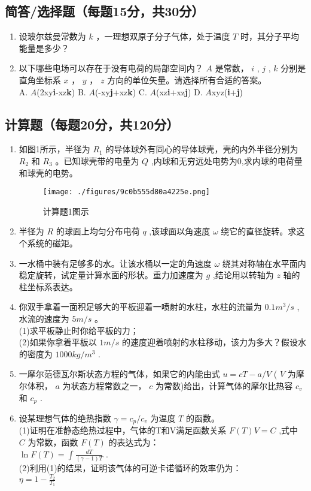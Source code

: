 


\subsection{简答/选择题（每题15分，共30分）}
\begin{enumerate}
\item 设玻尔兹曼常数为 $k$ ，一理想双原子分子气体，处于温度 $T$ 时，其分子平均能量是多少？
\item 以下哪些电场可以存在于没有电荷的局部空间内？ $A$ 是常数， $i$ , $j$ , $k$ 分别是直角坐标系 $x$ ， $y$ ， $z$ 方向的单位矢量。请选择所有合适的答案。\\
A. $A$(2xy\textbf{i}-xz\textbf{k}) B. $A$(-xy\textbf{j}+xz\textbf{k}) C. $A$(xz\textbf{i}+xz\textbf{j}) D. $A$xyz(\textbf{i}+\textbf{j})
\end{enumerate}
\subsection{计算题（每题20分，共120分）}
\begin{enumerate}
\item 如图1所示，半径为 $R_1$ 的导体球外有同心的导体球壳，壳的内外半径分别为 $R_2$ 和 $R_3$ 。已知球壳带的电量为 $Q$ ,内球和无穷远处电势为0,求内球的电荷量和球壳的电势。\\
\begin{figure}[ht]
\centering
\texttt{[image: ./figures/9c0b555d80a4225e.png]}
\caption{计算题1图示} \label{fig_USTC16_1}
\end{figure}
\item 半径为 $R$ 的球面上均匀分布电荷 $q$ ,该球面以角速度 $\omega$ 绕它的直径旋转。求这个系统的磁矩。
\item 一水桶中装有足够多的水。让该水桶以一定的角速度 $\omega$ 绕其对称轴在水平面内稳定旋转，试定量计算水面的形状。重力加速度为 $g$ ,结论用以转轴为 $z$ 轴的柱坐标系表达。
\item 你双手拿着一面积足够大的平板迎着一喷射的水柱，水柱的流量为 $0.1m^{3}/s$ ,水流的速度为 $5m/s$ 。\\
(1)求平板静止时你给平板的力；\\
(2)如果你拿着平板以 $1m/s$ 的速度迎着喷射的水柱移动，该力为多大？假设水的密度为 $1000kg/m^{3}$ .
\item 一摩尔范德瓦尔斯状态方程的气体，如果它的内能由式 $u=cT-a/V$ ( $V$ 为摩尔体积， $a$ 为状态方程常数之一， $c$ 为常数)给出，计算气体的摩尔比热容 $c_v$ 和 $c_p$ .
\item 设某理想气体的绝热指数 $\gamma =c_p/c_v$ 为温度 $T$ 的函数。\\
(1)证明在准静态绝热过程中，气体的T和V满足函数关系 $F(T)V=C$ ,式中 $C$ 为常数，函数 $F(T)$ 的表达式为：\\
 $\ln F(T)=\int \frac{dT}{(\gamma-1)T}$ .\\
(2)利用(1)的结果，证明该气体的可逆卡诺循环的效率仍为：\\
$\eta =1-\frac{T_2}{T_1}$
\end{enumerate}
